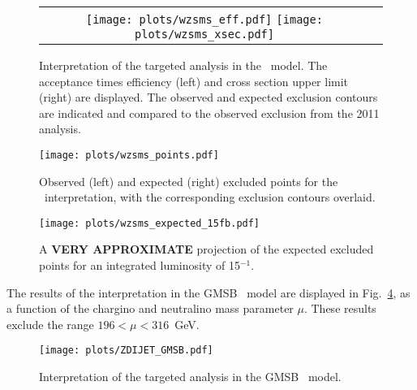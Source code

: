 \begin{figure}[!ht]
\begin{center}
\begin{tabular}{cc}
\texttt{[image: plots/wzsms\_eff.pdf]}
\texttt{[image: plots/wzsms\_xsec.pdf]}
\end{tabular}
\caption{ Interpretation of the targeted analysis in the \wzmet\ model. The acceptance times efficiency (left) and cross section
upper limit (right) are displayed. The observed and expected exclusion contours are indicated and compared to the observed
exclusion from the 2011 analysis. 
\label{fig:results_wzmet}}
\end{center}
\end{figure}

\begin{figure}[!hb]
\begin{center}
\texttt{[image: plots/wzsms\_points.pdf]}
\caption{ Observed (left) and expected (right) excluded points for the \wzmet\ interpretation, with the corresponding exclusion contours overlaid.
\label{fig:results_wzmetpoints}}
\end{center}
\end{figure}

\clearpage

\begin{figure}[!ht]
\begin{center}
\texttt{[image: plots/wzsms\_expected\_15fb.pdf]}
\caption{ A {\bf VERY APPROXIMATE} projection of the expected excluded points for an integrated luminosity of 15$^{-1}$. 
\label{fig:results_15fb}}
\end{center}
\end{figure}

The results of the interpretation in the GMSB \zzmet\ model are displayed in Fig.~\ref{fig:results_gmsb},
as a function of the chargino and neutralino mass parameter $\mu$. These results exclude the range $196 < \mu < 316$~GeV.

\begin{figure}[!hb]
\begin{center}
\texttt{[image: plots/ZDIJET\_GMSB.pdf]}
\caption{ Interpretation of the targeted analysis in the GMSB \zzmet\ model. 
\label{fig:results_gmsb}}
\end{center}
\end{figure}

